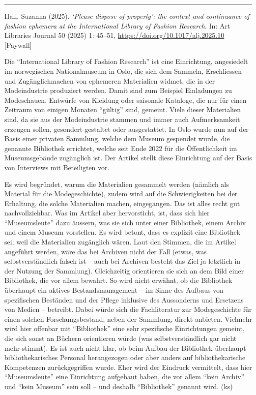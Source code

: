 \documentclass[a4paper,
fontsize=11pt,
oneside,
numbers=noperiodatend,
parskip=half-,
bibliography=totoc,
final
]{scrartcl}
\begin{document}
\begin{center}\rule{0.5\linewidth}{0.5pt}\end{center}

Hall, Suzanna (2025). \emph{\enquote*{Please dispose of properly}: the
context and continuance of fashion ephemera at the International Library
of Fashion Research}. In: Art Libraries Journal 50 (2025) 1: 45--51,
\url{https://doi.org/10.1017/alj.2025.10} {[}Paywall{]}

Die \enquote{International Library of Fashion Research} ist eine
Einrichtung, angesiedelt im norwegischen Nationalmuseum in Oslo, die
sich dem Sammeln, Erschliessen und Zugänglichmachen von ephemeren
Materialien widmet, die in der Modeindustrie produziert werden. Damit
sind zum Beispiel Einladungen zu Modeschauen, Entwürfe von Kleidung oder
saisonale Kataloge, die nur für einen Zeitraum von einigen Monaten
\enquote{gültig} sind, gemeint. Viele dieser Materialien sind, da sie
aus der Modeindustrie stammen und immer auch Aufmerksamkeit erzeugen
sollen, gesondert gestaltet oder ausgestattet. In Oslo wurde nun auf der
Basis einer privaten Sammlung, welche dem Museum gespendet wurde, die
genannte Bibliothek errichtet, welche seit Ende 2022 für die
Öffentlichkeit im Museumsgebäude zugänglich ist. Der Artikel stellt
diese Einrichtung auf der Basis von Interviews mit Beteiligten vor.

Es wird begründet, warum die Materialien gesammelt werden (nämlich als
Material für die Modegeschichte), zudem wird auf die Schwierigkeiten bei
der Erhaltung, die solche Materialien machen, eingegangen. Das ist alles
recht gut nachvollziehbar. Was im Artikel aber hervorsticht, ist, dass
sich hier \enquote{Museumsleute} dazu äussern, was sie sich unter einer
Bibliothek, einem Archiv und einem Museum vorstellen. Es wird betont,
dass es explizit eine Bibliothek sei, weil die Materialien zugänglich
wären. Laut den Stimmen, die im Artikel angeführt werden, wäre das bei
Archiven nicht der Fall (etwas, was selbstverständlich falsch ist --
auch bei Archiven besteht das Ziel ja letztlich in der Nutzung der
Sammlung). Gleichzeitig orientieren sie sich an dem Bild einer
Bibliothek, die vor allem bewahrt. So wird nicht erwähnt, ob die
Bibliothek überhaupt ein aktives Bestandsmanagement -- im Sinne des
Aufbaus von spezifischen Beständen und der Pflege inklusive des
Aussonderns und Ersetzens von Medien -- betreibt. Dabei würde sich die
Fachliteratur zur Modegeschichte für einen solchen Forschungsbestand,
neben der Sammlung, direkt anbieten. Vielmehr wird hier offenbar mit
\enquote{Bibliothek} eine sehr spezifische Einrichtungen gemeint, die
sich sonst an Büchern orientieren würde (was selbstverständlich gar
nicht mehr stimmt). Es ist auch nicht klar, ob beim Aufbau der
Bibliothek überhaupt bibliothekarisches Personal herangezogen oder aber
anders auf bibliothekarische Kompetenzen zurückgegriffen wurde. Eher
wird der Eindruck vermittelt, dass hier \enquote{Museumsleute} eine
Einrichtung aufgebaut haben, die vor allem \enquote{kein Archiv} und
\enquote{kein Museum} sein soll -- und deshalb \enquote{Bibliothek}
genannt wird. (ks)
\end{document}
